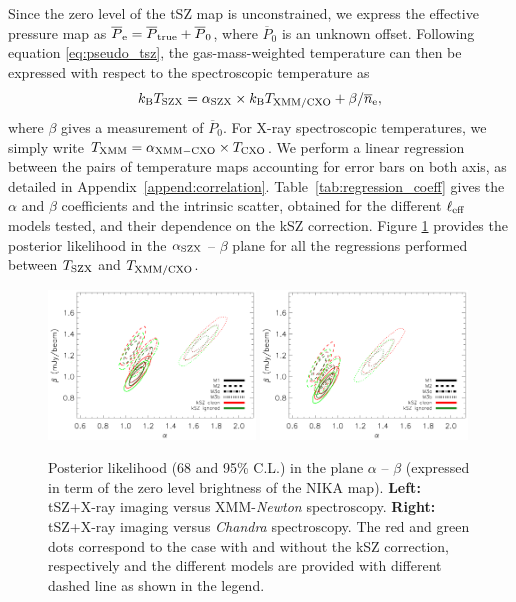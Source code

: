 \documentclass[twocolumn,traditabstract]{aa}
\newcommand{\ccor}[1]{\textcolor{Mypink}{#1}}
\def\TSZ {T_{\rm SZX}}
\def \TXC {T_{\rm CXO}}
\def \TXX {T_{\rm XMM}}
\def \TXXC {T_{\rm XMM/CXO}}
\begin{document}
Since the zero level of the tSZ map is unconstrained, we express the effective pressure map as $\overline{P}_{\rm e} = \overline{P}_{\rm true} + \overline{P}_0$, where $\overline{P}_0$ is an unknown offset. Following equation \ref{eq:pseudo_tsz}, the gas-mass-weighted temperature can then be expressed with respect to the spectroscopic temperature as
\begin{equation}
k_{\rm B} \TSZ = \alpha_{\rm SZX} \times k_{\rm B} \TXXC+ {\beta}/{\overline{n}_{\rm e}},
\label{eq:TSZ_TX_regression}
\end{equation}
where $\beta$ gives a measurement of $\overline{P}_0$. For X-ray spectroscopic temperatures, we simply write $\TXX = \alpha_{\rm XMM-CXO} \times \TXC$. We perform a linear regression between the pairs of temperature maps accounting for error bars on both axis, as detailed in Appendix~\ref{append:correlation}. Table~\ref{tab:regression_coeff} gives the $\alpha $ \ccor{and $\beta$} coefficients \ccor{and the intrinsic scatter}, obtained for the different $\ell_{\rm eff}$ models tested, and their dependence on the kSZ correction. \ccor{Figure \ref{fig:T_SZ_T_X_posterior} provides the posterior likelihood in the $\alpha_{\rm SZX}$ -- $\beta$ plane for all the regressions performed between $\TSZ$ and ${T}_{\rm XMM/CXO}$.}

\begin{figure}[h]
\centering
\includegraphics[width=0.49\textwidth]{Figure/Fit_Results_Likelihood_gmw-XMM.pdf}
\includegraphics[width=0.49\textwidth]{Figure/Fit_Results_Likelihood_gmw-CXO.pdf}
\caption{\footnotesize\ccor{Posterior likelihood (68 and 95\% C.L.) in the plane $\alpha$ -- $\beta$ (expressed in term of the zero level brightness of the NIKA map). {\bf Left:} tSZ+X-ray imaging versus XMM-\textit{Newton} spectroscopy. {\bf Right:} tSZ+X-ray imaging versus \textit{Chandra} spectroscopy. The red and green dots correspond to the case with and without the kSZ correction, respectively and the different models are provided with different dashed line as shown in the legend.}}
\label{fig:T_SZ_T_X_posterior}
\end{figure}
\end{document}
